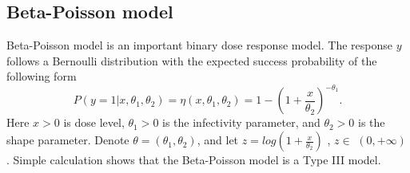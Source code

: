 \documentclass[12pt]{amsart}
\newtheorem{theorem}{Theorem}[section]
\theoremstyle{definition}
\theoremstyle{remark}
\numberwithin{equation}{section}
\begin{document}
    



\subsection{Beta-Poisson model}\label{secbeta}
Beta-Poisson model is an important binary dose response model. The response $y$ follows a Bernoulli distribution with the expected success probability of the following form
\[
P(y=1|x,\theta_1,\theta_2) = \eta(x,\theta_1,\theta_2)= 1-(1+\frac{x}{\theta_2})^{-\theta_1}.
\]
 Here $x> 0$ is dose level, $\theta_1>0$ is the infectivity parameter, and $\theta_2>0$ is the shape parameter. Denote $\theta = (\theta_1,\theta_2)$, and let $z = log(1+\frac{x}{\theta_2})$ , $z\in$ $(0,+\infty)$. Simple calculation shows that the Beta-Poisson model is a Type III model. 
 
\end{document}

